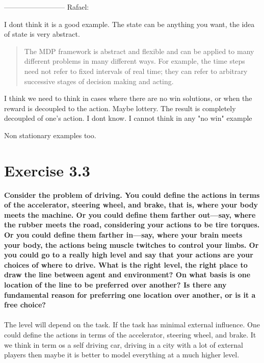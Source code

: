 \documentclass[a4paper,11pt]{article}
\numberwithin{equation}{section}
\theoremstyle{remark}
\begin{document}
--------------------------
Rafael:

I dont think it is a good example. The state can be anything you want, the idea of state is very abstract. 
\begin{quote}
The MDP framework is abstract and flexible and can be applied to many different
problems in many different ways. For example, the time steps need not refer to fixed
intervals of real time; they can refer to arbitrary successive stages of decision making
and acting. 
\end{quote}

I think we need to think in cases where there are no win solutions, or when the reward is decoupled to the action. 
Maybe lottery. The result is completely decoupled of one's action. I dont know.
I cannot think in any "no win" example 

Non stationary examples too. 


\section{Exercise 3.3}
\textbf{
Consider the problem of driving. You could define the actions in terms of
the accelerator, steering wheel, and brake, that is, where your body meets the machine.
Or you could define them farther out—say, where the rubber meets the road, considering
your actions to be tire torques. Or you could define them farther in—say, where your
brain meets your body, the actions being muscle twitches to control your limbs. Or you
could go to a really high level and say that your actions are your choices of where to drive.
What is the right level, the right place to draw the line between agent and environment?
On what basis is one location of the line to be preferred over another? Is there any
fundamental reason for preferring one location over another, or is it a free choice?
}
\\ \\

The level will depend on the task. If the task has minimal external influence. One could define the actions in terms of
the accelerator, steering wheel, and brake. It we think in term os a self driving car, driving in a city with a lot of external players then
maybe it is better to model everything at a much higher level. 
\end{document}
